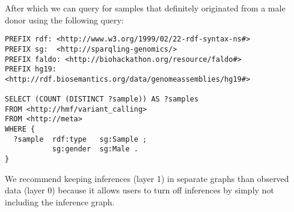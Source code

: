   After which we can query for samples that definitely originated from a male
  donor using the following query:

\begin{siderules}
\begin{verbatim}
PREFIX rdf: <http://www.w3.org/1999/02/22-rdf-syntax-ns#>
PREFIX sg:  <http://sparqling-genomics/>
PREFIX faldo: <http://biohackathon.org/resource/faldo#>
PREFIX hg19:  <http://rdf.biosemantics.org/data/genomeassemblies/hg19#>

SELECT (COUNT (DISTINCT ?sample)) AS ?samples
FROM <http://hmf/variant_calling>
FROM <http://meta>
WHERE {
  ?sample  rdf:type   sg:Sample ;
           sg:gender  sg:Male .
}
\end{verbatim}
\end{siderules}

  We recommend keeping inferences (layer 1) in separate graphs than observed
  data (layer 0) because it allows users to turn off inferences by simply not
  including the inference graph.

